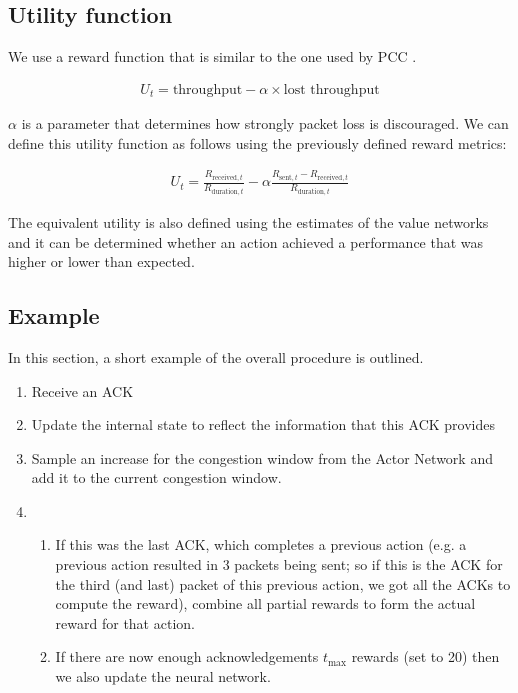 \documentclass[sigconf]{acmart}
\begin{document}
\subsection{Utility function}
\label{subsec:utility}


We use a reward function that is similar to the one used by PCC \cite{dong_pcc:_2015}.

\begin{align*}
U_t = \text{throughput} - \alpha \times \text{lost throughput}
\end{align*}

$\alpha$ is a parameter that determines how strongly packet loss is discouraged. We can define this utility function as follows using the previously defined reward metrics: 

\begin{align*}
U_t = \frac{R_{\text{received},t}}{R_{\text{duration},t}} - \alpha \frac{R_{\text{sent},t} - R_{\text{received},t}}{R_{\text{duration},t}}
\end{align*}

The equivalent utility is also defined using the estimates of the value networks and it can be determined whether an action achieved a performance that was higher or lower than expected. 

\subsection{Example}

In this section, a short example of the overall procedure is outlined. 

\begin{enumerate}
\item Receive an ACK
\item Update the internal state to reflect the information that this ACK provides
\item Sample an increase for the congestion window from the Actor Network and add it to the current congestion window.
\item 
\begin{enumerate}
\item If this was the last ACK, which completes a previous action (e.g. a previous action resulted in $3$ packets being sent; so if this is the ACK for the third (and last) packet of this previous action, we got all the ACKs to compute the reward), combine all partial rewards to form the actual reward for that action. 
\item If there are now enough acknowledgements $t_\text{max}$ rewards (set to 20) then we also update the neural network. 
\end{enumerate}

\end{enumerate}
\end{document}
